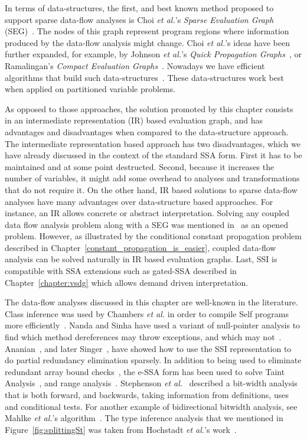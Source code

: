 In terms of data-structures, the first, and best known method proposed to support sparse data-flow analyses is Choi {\em et al.}'s {\em Sparse Evaluation Graph} (SEG)~\cite{Choi91}.
The nodes of this graph represent program regions where information produced by the data-flow analysis might change.
Choi {\em et al.}'s ideas have been further expanded, for example, by Johnson {\em et al.}'s {\em Quick Propagation Graphs}~\cite{Johnson93}, or Ramalingan's {\em Compact Evaluation Graphs}~\cite{Ramalingan02}.
Nowadays we have efficient algorithms that build such data-structures~\cite{Pingali95,Pingali97,Johnson94}.
These data-structures work best when applied on partitioned variable problems.

As opposed to those approaches, the solution promoted by this chapter consists in an intermediate representation (IR) based evaluation graph, and has advantages and disadvantages when compared to the data-structure approach.
The intermediate representation based approach has two disadvantages, which we have already discussed in the context of the standard SSA form.
First it has to be maintained and at some point destructed.
Second, because it increases the number of variables, it might add some overhead to analyses and transformations that do not require it.
On the other hand, IR based solutions to sparse data-flow analyses have many advantages over data-structure based approaches.
For instance, an IR allows concrete or abstract interpretation.
Solving any coupled data flow analysis problem along with a SEG was mentioned in~\cite{Choi91} as an opened problem.
However, as illustrated by the conditional constant propagation problem described in Chapter~\ref{constant_propagation_is_easier}, coupled data-flow analysis can be solved naturally in IR based evaluation graphs.
Last, SSI is compatible with SSA extensions such as gated-SSA described in Chapter~\ref{chapter:vsdg} which allows demand driven interpretation.

The data-flow analyses discussed in this chapter are well-known in the literature.
Class inference was used by Chambers {\em et al.} in order to compile Self programs more efficiently~\cite{Chambers89}.
Nanda and Sinha have used a variant of null-pointer analysis to find which method dereferences may throw exceptions, and which may not~\cite{Nanda09}.
Ananian~\cite{Ananian99}, and later Singer~\cite{Singer06}, have showed how to use the SSI representation to do partial redundancy elimination sparsely.
In addition to being used to eliminate redundant array bound checks~\cite{Bodik00}, the e-SSA form has been used to solve Taint Analysis~\cite{Rimsa11}, and range analysis~\cite{Su05,Gawlitza09}.
Stephenson {\em et al.}~\cite{Stephenson00} described a bit-width analysis that is both forward, and backwards, taking information from definitions, uses and conditional tests.
For another example of bidirectional bitwidth analysis, see Mahlke {\em et al.}'s algorithm~\cite{Mahlke01}.
The type inference analysis that we mentioned in Figure~\ref{fig:splittingSt} was taken from Hochstadt {\em et al.}'s work~\cite{Hochstadt08}.

